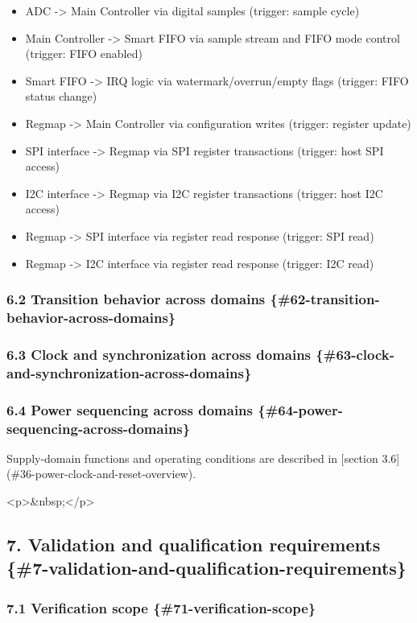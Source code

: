 \documentclass[11pt]{article}
\begin{document}
\begin{itemize}
\item ADC -> Main Controller via digital samples (trigger: sample cycle)
\item Main Controller -> Smart FIFO via sample stream and FIFO mode control (trigger: FIFO enabled)
\item Smart FIFO -> IRQ logic via watermark/overrun/empty flags (trigger: FIFO status change)
\item Regmap -> Main Controller via configuration writes (trigger: register update)
\item SPI interface -> Regmap via SPI register transactions (trigger: host SPI access)
\item I2C interface -> Regmap via I2C register transactions (trigger: host I2C access)
\item Regmap -> SPI interface via register read response (trigger: SPI read)
\item Regmap -> I2C interface via register read response (trigger: I2C read)
\end{itemize}

\subsubsection{6.2 Transition behavior across domains \{\#62-transition-behavior-across-domains\}}


\subsubsection{6.3 Clock and synchronization across domains \{\#63-clock-and-synchronization-across-domains\}}


\subsubsection{6.4 Power sequencing across domains \{\#64-power-sequencing-across-domains\}}


Supply-domain functions and operating conditions are described in [section 3.6](\#36-power-clock-and-reset-overview).

<p>\&nbsp;</p>

\subsection{7. Validation and qualification requirements \{\#7-validation-and-qualification-requirements\}}


\subsubsection{7.1 Verification scope \{\#71-verification-scope\}}
\end{document}
